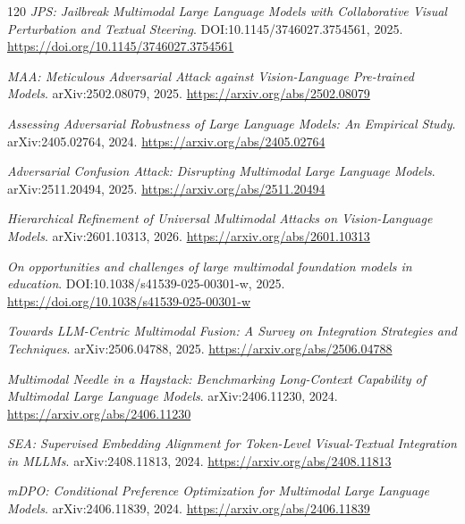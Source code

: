\documentclass[11pt,a4paper]{article}
\begin{document}
\begin{thebibliography}{120}
\newblock \emph{JPS: Jailbreak Multimodal Large Language Models with Collaborative Visual Perturbation and Textual Steering}.
\newblock DOI:10.1145/3746027.3754561, 2025.
\newblock \url{https://doi.org/10.1145/3746027.3754561}

\newblock \emph{MAA: Meticulous Adversarial Attack against Vision-Language Pre-trained Models}.
\newblock arXiv:2502.08079, 2025.
\newblock \url{https://arxiv.org/abs/2502.08079}

\newblock \emph{Assessing Adversarial Robustness of Large Language Models: An Empirical Study}.
\newblock arXiv:2405.02764, 2024.
\newblock \url{https://arxiv.org/abs/2405.02764}

\newblock \emph{Adversarial Confusion Attack: Disrupting Multimodal Large Language Models}.
\newblock arXiv:2511.20494, 2025.
\newblock \url{https://arxiv.org/abs/2511.20494}

\newblock \emph{Hierarchical Refinement of Universal Multimodal Attacks on Vision-Language Models}.
\newblock arXiv:2601.10313, 2026.
\newblock \url{https://arxiv.org/abs/2601.10313}

\newblock \emph{On opportunities and challenges of large multimodal foundation models in education}.
\newblock DOI:10.1038/s41539-025-00301-w, 2025.
\newblock \url{https://doi.org/10.1038/s41539-025-00301-w}

\newblock \emph{Towards LLM-Centric Multimodal Fusion: A Survey on Integration Strategies and Techniques}.
\newblock arXiv:2506.04788, 2025.
\newblock \url{https://arxiv.org/abs/2506.04788}

\newblock \emph{Multimodal Needle in a Haystack: Benchmarking Long-Context Capability of Multimodal Large Language Models}.
\newblock arXiv:2406.11230, 2024.
\newblock \url{https://arxiv.org/abs/2406.11230}

\newblock \emph{SEA: Supervised Embedding Alignment for Token-Level Visual-Textual Integration in MLLMs}.
\newblock arXiv:2408.11813, 2024.
\newblock \url{https://arxiv.org/abs/2408.11813}

\newblock \emph{mDPO: Conditional Preference Optimization for Multimodal Large Language Models}.
\newblock arXiv:2406.11839, 2024.
\newblock \url{https://arxiv.org/abs/2406.11839}


\end{thebibliography}
\end{document}
